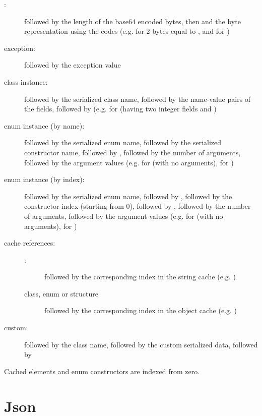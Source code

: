 \begin{description}
	\item[:]  followed by the length of the base64 encoded bytes, then \expr{:} and the byte representation using the codes  (e.g.  for 2 bytes equal to , and  for )
	\item[exception:]  followed by the exception value
	\item[class instance:]  followed by the serialized class name, followed by the name-value pairs of the fields, followed by  (e.g.  for  (having two integer fields  and )
        \item[enum instance (by name):]  followed by the serialized enum name, followed by the serialized constructor name, followed by \expr{:}, followed by the number of arguments, followed by the argument values (e.g.  for  (with no arguments),  for )
	\item[enum instance (by index):]  followed by the serialized enum name, followed by \expr{:}, followed by the constructor index (starting from 0), followed by \expr{:}, followed by the number of arguments, followed by the argument values (e.g.  for  (with no arguments),  for )
	\item[cache references:] \mbox{}
		\begin{description}
			\item[:]  followed by the corresponding index in the string cache (e.g. )
			\item[class, enum or structure]  followed by the corresponding index in the object cache (e.g. )
		\end{description}
	\item[custom:]  followed by the class name, followed by the custom serialized data, followed by 
\end{description}

\noindent Cached elements and enum constructors are indexed from zero.

\section{Json}
\label{std-Json}

